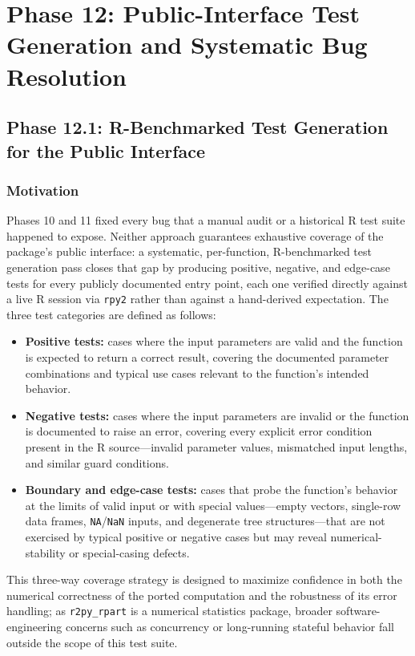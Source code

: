 \documentclass[12pt]{article}
\begin{document}
\section{Phase 12: Public-Interface Test Generation and Systematic Bug Resolution}
\label{sec:phase12}

\subsection{Phase 12.1: R-Benchmarked Test Generation for the Public Interface}
\label{sec:phase12.1}

\subsubsection{Motivation}

Phases 10 and 11 fixed every bug that a manual audit or a historical R test suite happened to expose. Neither approach guarantees exhaustive coverage of the package's public interface: a systematic, per-function, R-benchmarked test generation pass closes that gap by producing positive, negative, and edge-case tests for every publicly documented entry point, each one verified directly against a live R session via \texttt{rpy2} rather than against a hand-derived expectation. The three test categories are defined as follows:
\begin{itemize}
\item \textbf{Positive tests:} cases where the input parameters are valid and the function is expected to return a correct result, covering the documented parameter combinations and typical use cases relevant to the function's intended behavior.
\item \textbf{Negative tests:} cases where the input parameters are invalid or the function is documented to raise an error, covering every explicit error condition present in the R source---invalid parameter values, mismatched input lengths, and similar guard conditions.
\item \textbf{Boundary and edge-case tests:} cases that probe the function's behavior at the limits of valid input or with special values---empty vectors, single-row data frames, \texttt{NA}/\texttt{NaN} inputs, and degenerate tree structures---that are not exercised by typical positive or negative cases but may reveal numerical-stability or special-casing defects.
\end{itemize}
This three-way coverage strategy is designed to maximize confidence in both the numerical correctness of the ported computation and the robustness of its error handling; as \texttt{r2py\_rpart} is a numerical statistics package, broader software-engineering concerns such as concurrency or long-running stateful behavior fall outside the scope of this test suite.
\end{document}

